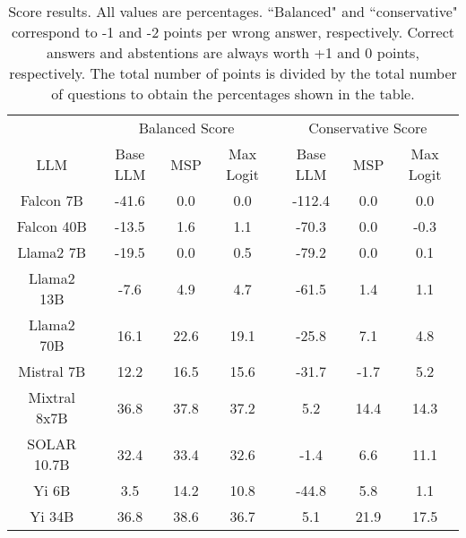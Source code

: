 \begin{table*}
\centering
\begin{tabular}{c|c|c|c|c|c|c}
& \multicolumn{3}{c|}{Balanced Score} & \multicolumn{3}{c}{Conservative Score} \\ 
LLM & Base LLM & MSP & Max Logit & Base LLM & MSP & Max Logit\\ \hline
Falcon 7B & -41.6 & 0.0 & 0.0 & -112.4 & 0.0 & 0.0\\
Falcon 40B & -13.5 & 1.6 & 1.1 & -70.3 & 0.0 & -0.3\\
Llama2 7B & -19.5 & 0.0 & 0.5 & -79.2 & 0.0 & 0.1\\
Llama2 13B & -7.6 & 4.9 & 4.7 & -61.5 & 1.4 & 1.1\\
Llama2 70B & 16.1 & 22.6 & 19.1 & -25.8 & 7.1 & 4.8\\
Mistral 7B & 12.2 & 16.5 & 15.6 & -31.7 & -1.7 & 5.2\\
Mixtral 8x7B & 36.8 & 37.8 & 37.2 & 5.2 & 14.4 & 14.3\\
SOLAR 10.7B & 32.4 & 33.4 & 32.6 & -1.4 & 6.6 & 11.1\\
Yi 6B & 3.5 & 14.2 & 10.8 & -44.8 & 5.8 & 1.1\\
Yi 34B & 36.8 & 38.6 & 36.7 & 5.1 & 21.9 & 17.5\\
\hline
\end{tabular}
\caption{Score results. All values are percentages. ``Balanced" and ``conservative" correspond to -1 and -2 points per wrong answer, respectively. Correct answers and abstentions are always worth +1 and 0 points, respectively. The total number of points is divided by the total number of questions to obtain the percentages shown in the table.}
\label{tab:score}
\end{table*}
